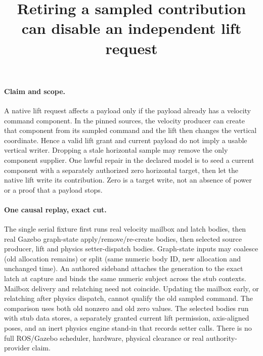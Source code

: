 \documentclass{article}
\title{Retiring a sampled contribution can disable an independent lift request}
\begin{document}
\maketitle
\paragraph{Claim and scope.}
A native lift request affects a payload only if the payload already has a velocity command component. In the pinned sources, the velocity producer can create that component from its sampled command and the lift then changes the vertical coordinate. Hence a valid lift grant and current payload do not imply a usable vertical writer. Dropping a stale horizontal sample may remove the only component supplier. One lawful repair in the declared model is to seed a current component with a separately authorized zero horizontal target, then let the native lift write its contribution. Zero is a target write, not an absence of power or a proof that a payload stops.

\paragraph{One causal replay, exact cut.}
The single serial fixture first runs real velocity mailbox and latch bodies, then real Gazebo graph-state apply/remove/re-create bodies, then selected source producer, lift and physics setter-dispatch bodies. Graph-state inputs may coalesce (old allocation remains) or split (same numeric body ID, new allocation and unchanged time). An authored sideband attaches the generation to the exact latch at capture and binds the same numeric subject across the stub contexts. Mailbox delivery and relatching need not coincide. Updating the mailbox early, or relatching after physics dispatch, cannot qualify the old sampled command. The comparison uses both old nonzero and old zero values. The selected bodies run with stub data stores, a separately granted current lift permission, axis-aligned poses, and an inert physics engine stand-in that records setter calls. There is no full ROS/Gazebo scheduler, hardware, physical clearance or real authority-provider claim.
\end{document}
